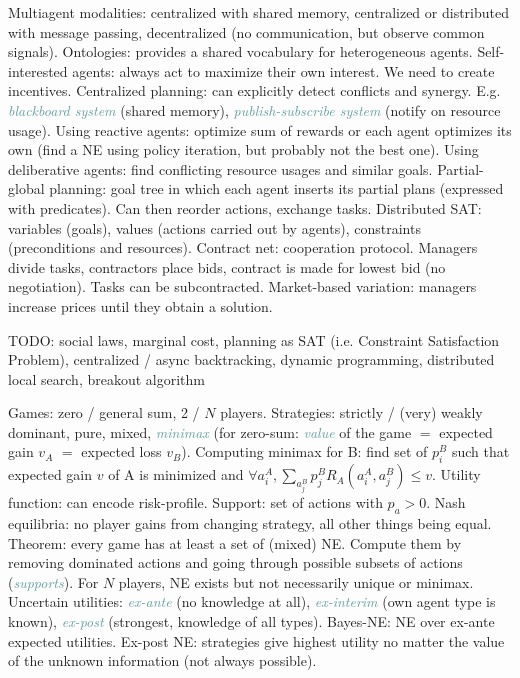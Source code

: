 \documentclass[10pt,a4paper,landscape]{article}
\newcommand{\concept}[1]{\textcolor{Emerald}{#1}} %
\newcommand{\subconcept}[1]{\textcolor{CadetBlue}{\textit{#1}}}
\renewcommand{\section}[1]{
    \vspace{-0.3cm}
    \begin{center}
      \color{Bittersweet}
      \hrulefill{\small~~#1~~}\hrulefill
    \end{center}
    \vspace{-0.3cm}
  }
\renewcommand{\subsection}[1]{\section{#1}}
\begin{document}
\begin{multicols*}{4}
\concept{Multiagent modalities}: centralized with shared memory, centralized or distributed with message passing, decentralized (no communication, but observe common signals).
\concept{Ontologies}: provides a shared vocabulary for heterogeneous agents.
\concept{Self-interested} agents: always act to maximize their own interest. We need to create incentives.
\concept{Centralized planning}: can explicitly detect conflicts and synergy. E.g. \subconcept{blackboard system} (shared memory), \subconcept{publish-subscribe system} (notify on resource usage).
Using reactive agents: optimize sum of rewards or each agent optimizes its own (find a NE using policy iteration, but probably not the best one).
Using deliberative agents: find conflicting resource usages and similar goals.
\concept{Partial-global planning}: goal tree in which each agent inserts its partial plans (expressed with predicates). Can then reorder actions, exchange tasks.
\concept{Distributed SAT}: variables (goals), values (actions carried out by agents), constraints (preconditions and resources).
\concept{Contract net}: cooperation protocol. Managers divide tasks, contractors place bids, contract is made for lowest bid (no negotiation). Tasks can be subcontracted. Market-based variation: managers increase prices until they obtain a solution.

\subsection{Distributed multiagent systems}

TODO: social laws, marginal cost, planning as SAT (i.e. Constraint Satisfaction Problem), centralized / async backtracking, dynamic programming, distributed local search, breakout algorithm

\section{Game theory}

\concept{Games}: zero / general sum, 2 / $N$ players.
\concept{Strategies}: strictly / (very) weakly dominant, pure, mixed, \subconcept{minimax} (for zero-sum: \subconcept{value} of the game $=$ expected gain $v_A$ $=$ expected loss $v_B$). Computing minimax for B: find set of $p_i^B$ such that expected gain $v$ of A is minimized and $\forall a_i^A, \sum_{a_j^B} p_j^B R_A(a_i^A, a_j^B) \leq v$.
\concept{Utility function}: can encode risk-profile.
\concept{Support}: set of actions with $p_a > 0$.
\concept{Nash equilibria}: no player gains from changing strategy, all other things being equal. Theorem: every game has at least a set of (mixed) NE. Compute them by removing dominated actions and going through possible subsets of actions (\subconcept{supports}). For $N$ players, NE exists but not necessarily unique or minimax.
\concept{Uncertain utilities}: \subconcept{ex-ante} (no knowledge at all), \subconcept{ex-interim} (own agent type is known), \subconcept{ex-post} (strongest, knowledge of all types).
\concept{Bayes-NE}: NE over ex-ante expected utilities.
\concept{Ex-post NE}: strategies give highest utility no matter the value of the unknown information (not always possible).


\end{multicols*}
\end{document}
